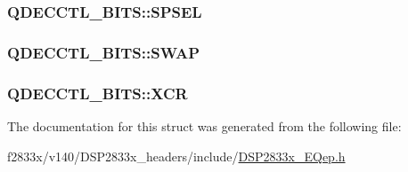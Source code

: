 \subsubsection[{S\+P\+S\+E\+L}]{ Q\+D\+E\+C\+C\+T\+L\+\_\+\+B\+I\+T\+S\+::\+S\+P\+S\+E\+L}\label{struct_q_d_e_c_c_t_l___b_i_t_s_a9938cddc3c8102a2c8dc4073ab5ce99e}
\hypertarget{struct_q_d_e_c_c_t_l___b_i_t_s_afbee23e2adcbb23eb9737bab27009079}{}
\subsubsection[{S\+W\+A\+P}]{ Q\+D\+E\+C\+C\+T\+L\+\_\+\+B\+I\+T\+S\+::\+S\+W\+A\+P}\label{struct_q_d_e_c_c_t_l___b_i_t_s_afbee23e2adcbb23eb9737bab27009079}
\hypertarget{struct_q_d_e_c_c_t_l___b_i_t_s_a967c7f00af9183a5a04fe7e656dfe07e}{}
\subsubsection[{X\+C\+R}]{ Q\+D\+E\+C\+C\+T\+L\+\_\+\+B\+I\+T\+S\+::\+X\+C\+R}\label{struct_q_d_e_c_c_t_l___b_i_t_s_a967c7f00af9183a5a04fe7e656dfe07e}


The documentation for this struct was generated from the following file\+:\begin{DoxyCompactItemize}
\item 
f2833x/v140/\+D\+S\+P2833x\+\_\+headers/include/\hyperlink{_d_s_p2833x___e_qep_8h}{D\+S\+P2833x\+\_\+\+E\+Qep.\+h}\end{DoxyCompactItemize}
